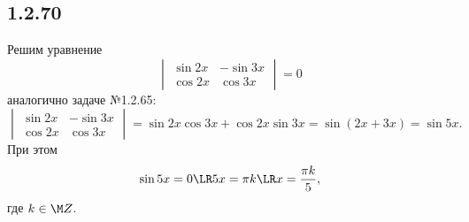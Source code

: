 \subsection{1.2.70}

Решим уравнение
\[
\begin{vmatrix}
	\sin2x & -\sin3x \\
	\cos2x & \cos3x
\end{vmatrix}
=0
\]
аналогично задаче №1.2.65:
\[
\begin{vmatrix}
	\sin2x & -\sin3x \\
	\cos2x & \cos3x
\end{vmatrix}
=\sin2x\cos3x+\cos2x\sin3x=\sin(2x+3x)=\sin5x.
\]
При этом
\[
\sin5x=0\LR5x=\pi k\LR x=\frac{\pi k}{5},
\]
где $k\in\M Z$.